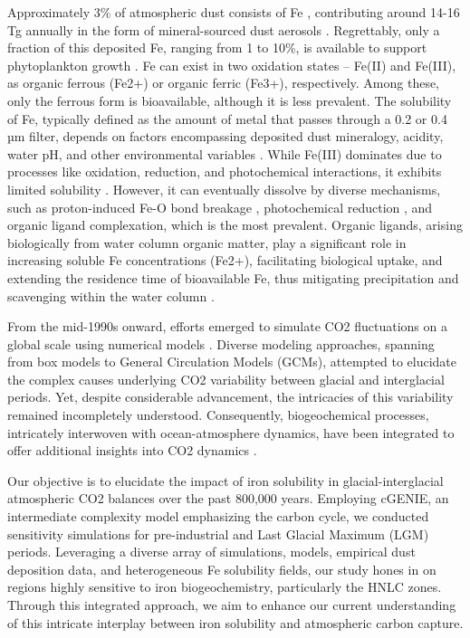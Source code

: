Approximately 3\% of atmospheric dust consists of Fe \cite{marcotte2020mineral}, contributing around 14-16 Tg annually in the form of mineral-sourced dust aerosols \cite{jickells2005global,gao2003aeolian}. Regrettably, only a fraction of this deposited Fe, ranging from 1 to 10\%, is available to support phytoplankton growth \cite{journet2008mineralogy,jickells2001atmospheric,archer2000model,bopp2003dust}. Fe can exist in two oxidation states – Fe(II) and Fe(III), as organic ferrous (Fe2+) or organic ferric (Fe3+), respectively. Among these, only the ferrous form is bioavailable, although it is less prevalent. The solubility of Fe, typically defined as the amount of metal that passes through a 0.2 or 0.4 µm filter, depends on factors encompassing deposited dust mineralogy, acidity, water pH, and other environmental variables \cite{luo2005estimation,sholkovitz2012fractional,marcotte2020mineral}. While Fe(III) dominates due to processes like oxidation, reduction, and photochemical interactions, it exhibits limited solubility \cite{wells1995iron,byrne2000iron}. However, it can eventually dissolve by diverse mechanisms, such as proton-induced Fe-O bond breakage \cite{cwiertny2008characterization}, photochemical reduction \cite{fu2010photoreductive}, and organic ligand complexation, which is the most prevalent. Organic ligands, arising biologically from water column organic matter, play a significant role in increasing soluble Fe concentrations (Fe2+), facilitating biological uptake, and extending the residence time of bioavailable Fe, thus mitigating precipitation and scavenging within the water column \cite{baker2010atmospheric}.

From the mid-1990s onward, efforts emerged to simulate CO2 fluctuations on a global scale using numerical models \cite{johnson1997controls}. Diverse modeling approaches, spanning from box models to General Circulation Models (GCMs), attempted to elucidate the complex causes underlying CO2 variability between glacial and interglacial periods. Yet, despite considerable advancement, the intricacies of this variability remained incompletely understood. Consequently, biogeochemical processes, intricately interwoven with ocean-atmosphere dynamics, have been integrated to offer additional insights into CO2 dynamics \cite{flato2014evaluation}.

Our objective is to elucidate the impact of iron solubility in glacial-interglacial atmospheric CO2 balances over the past 800,000 years. Employing cGENIE, an intermediate complexity model emphasizing the carbon cycle, we conducted sensitivity simulations for pre-industrial and Last Glacial Maximum (LGM) periods. Leveraging a diverse array of simulations, models, empirical dust deposition data, and heterogeneous Fe solubility fields, our study hones in on regions highly sensitive to iron biogeochemistry, particularly the HNLC zones. Through this integrated approach, we aim to enhance our current understanding of this intricate interplay between iron solubility and atmospheric carbon capture.
